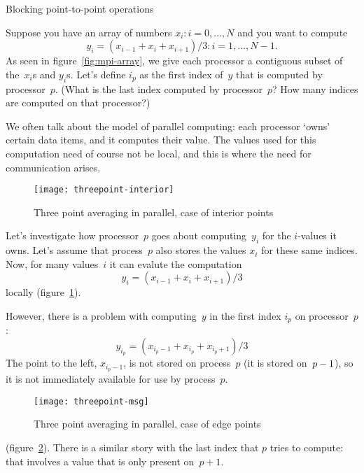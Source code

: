 
 {Blocking point-to-point operations}

Suppose you have an array of numbers $x_i\colon i=0,\ldots,N$
and you want to compute
\[ y_i=(x_{i-1}+x_i+x_{i+1})/3\colon i=1,\ldots,N-1. \]
As seen in figure~\ref{fig:mpi-array}, we give each processor
a contiguous subset of the~$x_i$s and $y_i$s.
Let's define $i_p$ as the first index of~$y$ that is
computed by processor~$p$. (What is the last index computed by processor~$p$?
How many indices are computed on that processor?)

We often talk about the 
model of parallel computing: each processor `owns' certain data items,
and it computes their value. The values used for this computation
need of course not be local, and this is where the need for
communication arises.

\begin{comment}
  \begin{figure}[t]
    \texttt{[image: threepoint-scheme]}
    \caption{Three point averaging}
    \label{fig:3pt}
  \end{figure}
\end{comment}

\begin{figure}[t]
  \texttt{[image: threepoint-interior]}
  \caption{Three point averaging in parallel, case of interior points}
  \label{fig:3pt-interior}
\end{figure}
%
Let's investigate how processor~$p$ goes about computing~$y_i$ for
the $i$-values it owns. Let's assume that process~$p$ also stores
the values $x_i$ for these same indices.
Now, for many values~$i$ it can evalute the computation
\[ y_{i} = (x_{i-1}+x_{i}+x_{i+1})/3 \]
locally (figure~\ref{fig:3pt-interior}).

However, there is a problem with computing~$y$
in the first index $i_p$ on processor~$p$:
\[ y_{i_p} = (x_{i_p-1}+x_{i_p}+x_{i_p+1})/3 \]
The point to the left, $x_{i_p-1}$,
is not stored on process~$p$
(it is stored on~$p-\nobreak1$),
so it is not immediately available for use by process~$p$.
%
\begin{figure}[t]
  \texttt{[image: threepoint-msg]}
  \caption{Three point averaging in parallel, case of edge points}
  \label{fig:3pt-msg}
\end{figure}
%
(figure~\ref{fig:3pt-msg}).
There is a similar story with the last index that $p$ tries to compute:
that involves a value that is only present on~$p+1$.

